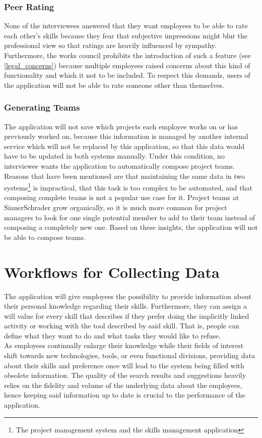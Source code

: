 \subsubsection{Peer Rating}
\label{peerrating}
None of the interviewees answered that they want employees to be able to rate each other's skills because they fear that subjective impressions might blur the professional view so that ratings are heavily influenced by sympathy. Furthermore, the works council prohibits the introduction of such a feature (see \ref{legal_concerns}) because multiple employees raised concerns about this kind of functionality and whish it not to be included. To respect this demands, users of the application will not be able to rate someone other than themselves.

\subsubsection{Generating Teams}
The application will not save which projects each employee works on or has previously worked on, because this information is managed by another internal service which will not be replaced by this application, so that this data would have to be updated in both systems manually. Under this condition, no interviewee wants the application to automatically compose project teams. Reasons that have been mentioned are that maintaining the same data in two systems\footnote{The project management system and the skills management application} is impractical, that this task is too complex to be automated, and that composing complete teams is not a popular use case for it. Project teams at SinnerSchrader grow organically, so it is much more common for project managers to look for one single potential member to add to their team instead of composing a completely new one. Based on these insights, the application will not be able to compose teams.

\section{Workflows for Collecting Data}

The application will give employees the possibility to provide information about their personal knowledge regarding their skills.
Furthermore, they can assign a will value for every skill that describes if they prefer
doing the implicitly linked activity or working with the tool described by said skill. That is, people can define what they want to do and what tasks they would like to refuse.\\
As employees continually enlarge their knowledge while their fields of interest shift towards new technologies, tools, or even
functional divisions, providing data about their skills and preference once will lead to the system being filled with obsolete
information. The quality of the search results and suggestions heavily relies on the fidelity and volume of the underlying data about the employees, hence keeping said information up to date is crucial to the performance of the application.

